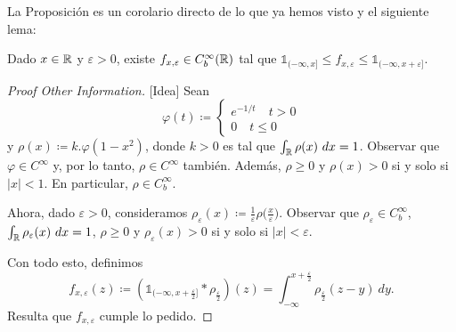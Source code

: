 La Proposición es un corolario directo de lo que ya hemos visto y el siguiente lema:

\begin{lemma}
	Dado $x \in \mathbb{R}$ y $\varepsilon > 0$, existe $f_{x, \varepsilon} \in C_{b}^{\infty}(\mathbb{R})$ tal que $\mathds{1}_{(-\infty,x]} \leq f_{x, \varepsilon} \leq \mathds{1}_{(-\infty,x + \varepsilon]}$.
\end{lemma}
\begin{proof}[Proof Other Information][Idea]
	Sean 
	\[ \varphi(t) \coloneq \begin{cases}
		e^{-1 \slash t} \quad t > 0 \\
		0 \quad t \leq 0
	\end{cases}\]
	y $\rho(x) \coloneq k . \varphi (1 - x^{2})$, donde $k > 0$ es tal que $\int_{\mathbb{R}} \rho(x) \ dx = 1$. Observar que $\varphi \in C^{\infty}$ y, por lo tanto, $\rho \in C^{\infty}$ también. Además, $\rho \geq 0$ y $\rho(x) > 0$ si y solo si $|x| < 1$. En particular, $\rho \in C_{b}^{\infty}$. \par
	Ahora, dado $\varepsilon > 0$, consideramos $\rho_{\varepsilon}(x) \coloneq \frac{1}{\varepsilon} \rho \big( \frac{x}{\varepsilon} \big)$. Observar que $\rho_{\varepsilon} \in C_{b}^{\infty}$, $\int_{\mathbb{R}} \rho_{\varepsilon}(x) \ dx = 1$, $\rho \geq 0$ y $\rho_{\varepsilon}(x) > 0$ si y solo si $|x| < \varepsilon$. \par
	Con todo esto, definimos
	\[ f_{x, \varepsilon}(z) \coloneq \left( \mathds{1}_{(-\infty,x + \frac{\varepsilon}{2}]} * \rho_{\frac{\varepsilon}{2}} \right)(z) = \int_{-\infty}^{x + \frac{\varepsilon}{2}} \rho_{\frac{\varepsilon}{2}}(z - y) \ dy. \]
	Resulta que $f_{x, \varepsilon}$ cumple lo pedido.
\end{proof}

